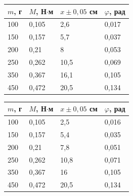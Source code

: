\documentclass[a4paper, 12pt]{article}
\begin{document}
 \begin{table}[h!]
 \centering
    \parbox{.4 \textwidth}{
        \centering
        \begin{tabular}{|l|l|l|l|}
        \hline
            $m$, г & $M$, Н$\cdot$м & $x \pm 0,05$ см & $\varphi$, рад \\ \hline
            100 & 0,105 & 2,6 & 0,017 \\ \hline
            150 & 0,157 & 5,7 & 0,037 \\ \hline
            200 & 0,21 & 8 & 0,053 \\ \hline
            250 & 0,262 & 10,5 & 0,069 \\ \hline
            350 & 0,367 & 16,1 & 0,105 \\ \hline
            450 & 0,472 & 20,5 & 0,134 \\ \hline
        \end{tabular}
        \label{tab:1}
    }
    \hfill
    \parbox{.5 \textwidth}{
        \centering
        \begin{tabular}{|l|l|l|l|}
        \hline
            $m$, г & $M$, Н$\cdot$м & $x \pm 0,05$ см & $\varphi$, рад \\ \hline
            100 & 0,105 & 2,5 & 0,016 \\ \hline
            150 & 0,157 & 5,4 & 0,035 \\ \hline
            200 & 0,21 & 7,8 & 0,051 \\ \hline
            250 & 0,262 & 10,8 & 0,071 \\ \hline
            350 & 0,367 & 16 & 0,105 \\ \hline
            450 & 0,472 & 20,5 & 0,134 \\ \hline
        \end{tabular}
        \label{tab:2}
    }
 \end{table}
\end{document}
